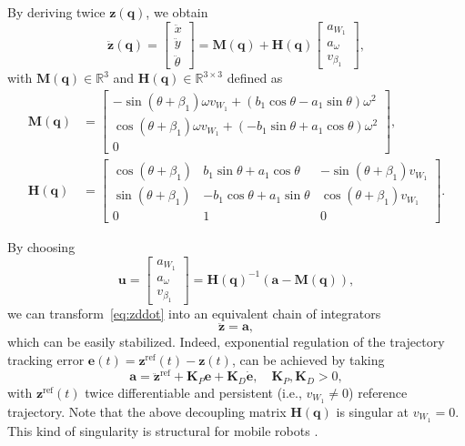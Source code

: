 By deriving twice $\bm{z}(\bm{q})$, we obtain
\begin{equation}
\label{eq:zddot}
    \ddot{\bm{z}}(\bm{q})
    =
    \begin{bmatrix}
        \ddot{x} \\ \ddot{y} \\ \ddot{\theta}
    \end{bmatrix}
    =
    \bm{M}(\bm{q}) +
    \bm{H}(\bm{q})
    \begin{bmatrix}
        a_{W_1} \\ a_{\omega} \\ v_{\beta_1}
    \end{bmatrix},
\end{equation}
with $\bm{M}(\bm{q}) \in \mathbb{R}^3$ and $\bm{H}(\bm{q}) \in \mathbb{R}^{3 \times 3}$ defined as
\begin{align*}
    \bm{M}(\bm{q})
    &=
    \begin{bmatrix}
        -\sin(\theta+\beta_1) \omega v_{W_1} + ( b_1 \cos\theta - a_1 \sin\theta) \omega^2 \\
         \cos(\theta+\beta_1) \omega v_{W_1} + (-b_1 \sin\theta + a_1 \cos\theta) \omega^2 \\
        0
    \end{bmatrix}, \\
    \bm{H}(\bm{q})
    &=
    \begin{bmatrix}
        \cos(\theta+\beta_1) &  b_1 \sin\theta + a_1 \cos\theta & -\sin(\theta+\beta_1) v_{W_1} \\
        \sin(\theta+\beta_1) & -b_1 \cos\theta + a_1 \sin\theta &  \cos(\theta+\beta_1) v_{W_1} \\
        0 & 1 & 0
    \end{bmatrix}.
\end{align*}

By choosing
\begin{equation*}
    \bm{u} = \begin{bmatrix}
        a_{W_1} \\ a_{\omega} \\ v_{\beta_1}
    \end{bmatrix}
    = \bm{H}(\bm{q})^{-1} \left(\bm{a} - \bm{M}(\bm{q})\right),
\end{equation*}
we can transform~\eqref{eq:zddot} into an equivalent chain of integrators
\begin{equation*}
    \ddot{\bm{z}} = \bm{a},
\end{equation*}
which can be easily stabilized. Indeed, exponential regulation of the trajectory
tracking error $\bm{e}(t) = \bm{z}^{\mathrm{ref}}(t)-\bm{z}(t)$, can be
achieved by taking
\begin{equation*}
    \bm{a} = \ddot{\bm{z}}^{\mathrm{ref}} + \bm{K}_P \bm{e} + \bm{K}_D \dot{\bm{e}}, \quad \bm{K}_P, \bm{K}_D > 0,
\end{equation*}
with $\bm{z}^{\mathrm{ref}}(t)$ twice differentiable and persistent
(i.e., $v_{W_1} \ne 0$) reference trajectory. Note that the above decoupling
matrix $\bm{H}(\bm{q})$ is singular at $v_{W_1} = 0$. This kind of singularity
is structural for mobile robots \cite{Oriolo2002WMRControlDFL}.

